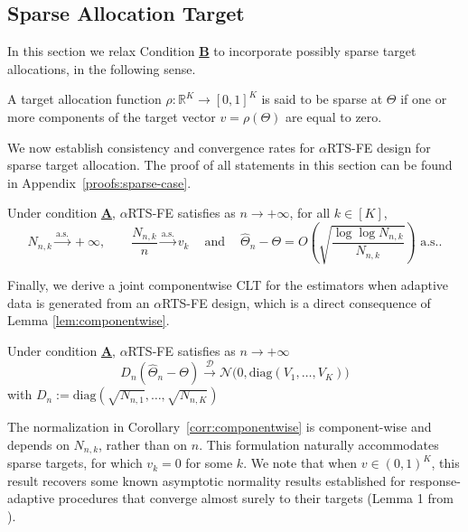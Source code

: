 \subsection{Sparse Allocation Target} 

In this section we relax Condition \hyperlink{CB}{\textbf{B}} to incorporate possibly sparse target allocations, in the following sense.

\begin{definition}
	A target allocation function \(\rho: \mathbb{R}^K \to [0,1]^K\) is said to be sparse at \(\Theta\) if one or more components of the target vector \(v = \rho(\Theta)\) are equal to zero.
\end{definition}

We now establish consistency and convergence rates for \(\alpha\)RTS-FE design for sparse target allocation. The proof of all statements in this section can be found in Appendix~\ref{proofs:sparse-case}.


\begin{theorem}\label{thm:sparse-rate}
	Under condition \hyperlink{CA}{\textbf{A}}, \(\alpha\)RTS-FE satisfies as \(n \to +\infty\), for all $k \in [K]$,
	\[
	N_{n,k}\xrightarrow{\text{a.s.}}+\infty,\qquad
	\frac{N_{n,k}}{n}\xrightarrow{\text{a.s.}}v_k \ \ \ \
	\text{ and } \ \ \ \ \hat\Theta_n-\Theta=O\!\left(\sqrt{\frac{\log\log N_{n,k}}{N_{n,k}}}\right)\text{ a.s.}.
	\]
\end{theorem}

Finally, we derive a joint componentwise CLT for the estimators when adaptive data is generated from an \(\alpha\)RTS-FE design, which is a direct consequence of Lemma \ref{lem:componentwise}.

\begin{corollary}\label{corr:componentwise}
		Under condition \hyperlink{CA}{\textbf{A}}, \(\alpha\)RTS-FE satisfies as \(n \to +\infty\)
		\[
		D_n(\hat\Theta_n-\Theta)\xrightarrow{\mathcal{D}}
		\mathcal N\!\big(0,\mathrm{diag}\left(V_1,\dots,V_K\right)\big)
		\]
		with $D_n:=\mathrm{diag}(\sqrt{N_{n,1}},\dots,\sqrt{N_{n,K}})$
	\end{corollary}
	
\begin{remark}\label{cor:sparse-clt}
		The normalization in Corollary~\ref{corr:componentwise} is component-wise and depends on \(N_{n,k}\), rather than on \(n\). This formulation naturally accommodates sparse targets, for which
		\(v_k = 0\) for some $k$. We note that when \(v \in (0, 1)^K\), this result recovers some known asymptotic normality results established for response-adaptive procedures that converge almost surely to their targets (Lemma 1 from  \cite{hu2006asymptotically}).
	\end{remark}


